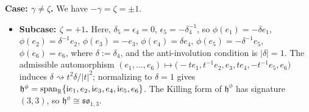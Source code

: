 \documentclass[10pt,a4paper]{amsart}
\newlength{\caseIndent}
\DeclareMathOperator{\spanOperator}{span}
\newcommand{\bbR}{\mathbb{R}}
\newcommand{\mfh} {\mathfrak{h}}
\newcommand{\mfso} {\mathfrak{so}}
\numberwithin{equation}{section}
\begin{document}
\smallskip
\noindent \textbf{Case: $\gamma \neq \zeta$.} We have $-\gamma = \zeta = \pm 1$.
\begin{itemize}[leftmargin=\caseIndent]
	\item[] \textbf{Subcase: $\zeta = +1$.} Here, $\delta_5 = \epsilon_4 = 0$, $\epsilon_5 = -\delta_4^{-1}$, so $\phi(e_1) = -\delta e_1$, $\phi(e_2) = \delta^{-1} e_2$, $\phi(e_3) = -e_3$, $\phi(e_4) = \delta e_4$, $\phi(e_5) = -\delta^{-1} e_5$, $\phi(e_6) = e_6$, where $\delta := \delta_4$, and the anti-involution condition is $|\delta| = 1$. The admissible automorphism $(e_1, \ldots, e_6) \mapsto \big({-}t e_1, t^{-1} e_2, e_3, t e_4, -t^{-1} e_5, e_6\big)$ induces $\delta \rightsquigarrow t^2 \delta / |t|^2$; normalizing to $\delta = 1$ gives $\mfh^{\phi} = \spanOperator_{\bbR}\{{\rm i} e_1, e_2, {\rm i} e_3, e_4, {\rm i} e_5, e_6\}$. The Killing form of $\mfh^{\phi}$ has signature $(3, 3)$, so $\mfh^{\phi} \cong \mfso_{1, 3}$.


\end{itemize}
\end{document}
